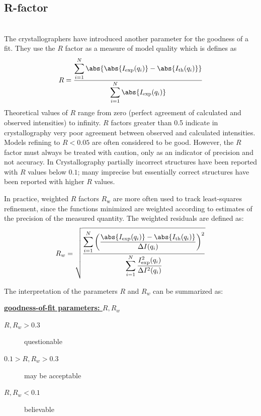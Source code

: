 \subsection{R-factor}
~\\
The crystallographers have introduced another parameter for the goodness of a fit.
They use the $R$ factor \cite{Rfactor,Hamilton1965} as a measure of model quality which is defines as
\begin{equation}\label{eqRfactor}
  R  \displaystyle  = \frac{\displaystyle\sum_{i=1}^N
\abs{\abs{I_\text{exp}(q_i)} -
\abs{I_\text{th}(q_i)}}}{\displaystyle\sum_{i=1}^N
\abs{I_\text{exp}(q_i)}}
\end{equation}
Theoretical values of $R$ range from zero (perfect
agreement of calculated and observed intensities) to infinity.  $R$
factors greater than 0.5 indicate in crystallography very poor
agreement between observed and calculated intensities. Models
refining to $R < 0.05$ are often considered to be good. However, the
$R$ factor must always be treated with caution, only as an indicator of
precision and not accuracy. In Crystallography partially incorrect
structures have been reported with $R$ values below $0.1$; many
imprecise but essentially correct structures have been reported with
higher $R$ values.

In practice, weighted $R$ factors $R_\text{w}$ are more often used
to track least-squares refinement, since the functions minimized are
weighted according to estimates of the precision of the measured
quantity. The weighted residuals are defined as:
\begin{equation} \displaystyle R_{w} =
\sqrt{\frac{\displaystyle\sum_{i=1}^N \left(\frac{\abs{I_\text{exp}(q_i)}
- \abs{I_\text{th}(q_i)}}{\Delta
I(q_i)}\right)^2}{\displaystyle\sum_{i=1}^N
\frac{I_\text{exp}^2(q_i)}{\Delta I^2(q_i)}}}
\end{equation}


The interpretation of the parameters $R$ and $R_w$ can be summarized as:

\vspace{5mm}

\underline{\bf goodness-of-fit parameters: $R,R_w$}
\begin{description}
\item[$R,R_w>0.3$] questionable
\item[$0.1 > R,R_w >0.3$] may be acceptable
\item[$R,R_w<0.1$] believable
\end{description}

